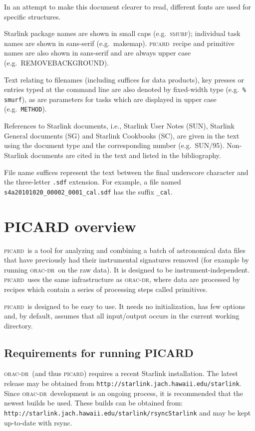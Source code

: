\documentclass[twoside,11pt]{article}
\newcommand{\htmladdnormallink}[2]{#1}
\newcommand{\xref}[3]{#1}
\newcommand{\xlabel}[1]{}
\renewcommand{\_}{\texttt{\symbol{95}}}
\newcommand{\SMURF}{\textsc{smurf}}
\newcommand{\oracdr}{\textsc{orac-dr}}
\newcommand{\picard}{\textsc{picard}}
\newcommand{\task}[1]{\textsf{#1}}
\newcommand{\makemap}{\xref{\task{makemap}}{sun258}{MAKEMAP}}
\newcommand{\aparam}[1]{\texttt{#1}}     %
\begin{document}
In an attempt to make this document clearer to read, different fonts
are used for specific structures.

Starlink package names are shown in small caps (e.g.\ \SMURF);
individual task names are shown in sans-serif
(e.g.\ \makemap). \picard\ recipe and primitive names are also shown
in sans-serif and are always upper case (e.g.\ \task{REMOVE\_BACKGROUND}).

Text relating to filenames (including suffices for data products), key
presses or entries typed at the command line are also denoted by
fixed-width type (e.g.\ \texttt{\% smurf}), as are parameters for
tasks which are displayed in upper case (e.g.\ \aparam{METHOD}).

References to Starlink documents, i.e., Starlink User Notes (SUN),
Starlink General documents (SG) and Starlink Cookbooks (SC), are given
in the text using the document type and the corresponding number
(e.g.\ SUN/95). Non-Starlink documents are cited in the text and
listed in the bibliography.

File name suffices represent the text between the final underscore
character and the three-letter \verb+.sdf+ extension. For example, a
file named \verb+s4a20101020_00002_0001_cal.sdf+ has the suffix
\verb+_cal+.

\section{\xlabel{picard}PICARD overview\label{se:picard}}

\picard\ is a tool for analyzing and combining a batch of astronomical
data files that have previously had their instrumental signatures
removed (for example by running \oracdr\ on the raw data). It is
designed to be instrument-independent. \picard\ uses the same
infrastructure as \oracdr, where data are processed by recipes which
contain a series of processing steps called primitives.

\picard\ is designed to be easy to use. It needs no initialization,
has few options and, by default, assumes that all input/output occurs
in the current working directory.

\subsection{Requirements for running PICARD}

\oracdr\ (and thus \picard) requires a recent Starlink
installation. The latest release may be obtained from
\htmladdnormallink{\texttt{http://starlink.jach.hawaii.edu/starlink}}{http://starlink.jach.hawaii.edu/starlink}. Since
\oracdr\ development is an ongoing process, it is recommended that the
newest builds be used. These builds can be obtained from:
\htmladdnormallink{\texttt{http://starlink.jach.hawaii.edu/starlink/rsyncStarlink}}{http://starlink.jach.hawaii.edu/starlink/rsyncStarlink}
and may be kept up-to-date with rsync.
\end{document}
